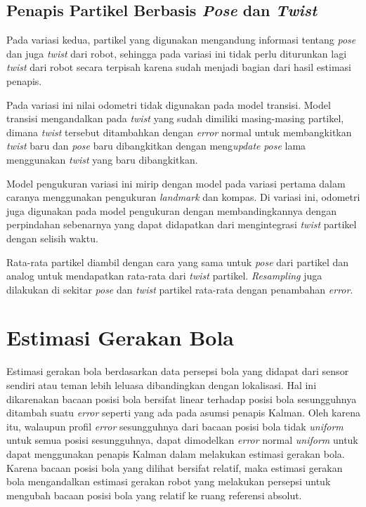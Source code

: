 \subsection{Penapis Partikel Berbasis \textit{Pose} dan \textit{Twist}}

Pada variasi kedua, partikel yang digunakan mengandung informasi tentang \textit{pose} dan juga \textit{twist} dari robot, sehingga pada variasi ini tidak perlu diturunkan lagi \textit{twist} dari robot secara terpisah karena sudah menjadi bagian dari hasil estimasi penapis.

Pada variasi ini nilai odometri tidak digunakan pada model transisi. Model transisi mengandalkan pada \textit{twist} yang sudah dimiliki masing-masing partikel, dimana \textit{twist} tersebut ditambahkan dengan \textit{error} normal untuk membangkitkan \textit{twist} baru dan \textit{pose} baru dibangkitkan dengan meng\textit{update} \textit{pose} lama menggunakan \textit{twist} yang baru dibangkitkan.

Model pengukuran variasi ini mirip dengan model pada variasi pertama dalam caranya menggunakan pengukuran \textit{landmark} dan kompas. Di variasi ini, odometri juga digunakan pada model pengukuran dengan membandingkannya dengan perpindahan sebenarnya yang dapat didapatkan dari mengintegrasi \textit{twist} partikel dengan selisih waktu.

Rata-rata partikel diambil dengan cara yang sama untuk \textit{pose} dari partikel dan analog untuk mendapatkan rata-rata dari \textit{twist} partikel. \textit{Resampling} juga dilakukan di sekitar \textit{pose} dan \textit{twist} partikel rata-rata dengan penambahan \textit{error}.

\section{Estimasi Gerakan Bola}

Estimasi gerakan bola berdasarkan data persepsi bola yang didapat dari sensor sendiri atau teman lebih leluasa dibandingkan dengan lokalisasi. Hal ini dikarenakan bacaan posisi bola bersifat linear terhadap posisi bola sesungguhnya ditambah suatu \textit{error} seperti yang ada pada asumsi penapis Kalman. Oleh karena itu, walaupun profil \textit{error} sesungguhnya dari bacaan posisi bola tidak \textit{uniform} untuk semua posisi sesungguhnya, dapat dimodelkan \textit{error} normal \textit{uniform} untuk dapat menggunakan penapis Kalman dalam melakukan estimasi gerakan bola. Karena bacaan posisi bola yang dilihat bersifat relatif, maka estimasi gerakan bola mengandalkan estimasi gerakan robot yang melakukan persepsi untuk mengubah bacaan posisi bola yang relatif ke ruang referensi absolut.

